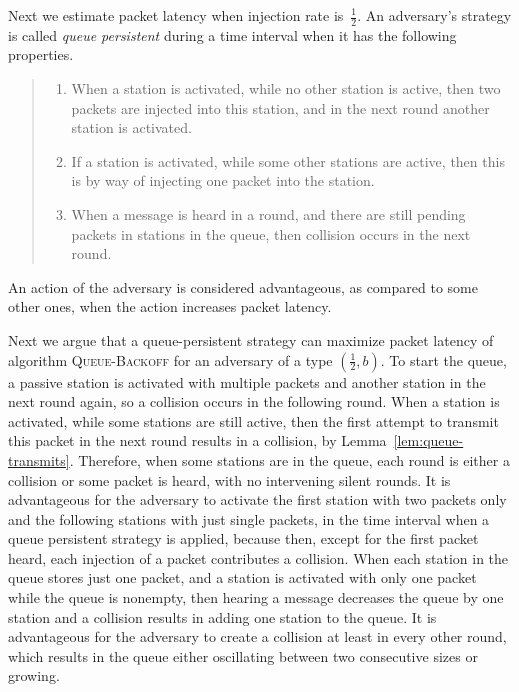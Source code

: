 \documentclass[11pt]{article}
\begin{document}
Next we estimate packet latency when injection rate is~$\frac{1}{2}$.
An adversary's strategy is called \emph{queue persistent}  during a time interval  when it has the following properties.
\begin{quote}
\begin{enumerate}
\item
When a station is activated, while no other station is active, then two packets are injected into this station, and in the next round another station is activated.
\item
If a station is activated, while some other stations are active, then this is by way of injecting one packet into the station.
\item
When a message is heard in a round, and there are still pending packets in stations in the queue,  then collision occurs in the next round.
\end{enumerate}
\end{quote}
An action of the adversary is considered advantageous, as compared to some other ones, when the action increases packet latency. 

Next we argue that a queue-persistent strategy can maximize packet latency of algorithm \textsc{Queue-Backoff} for an adversary of a type $(\frac{1}{2},b)$. 
To start the queue, a passive station is activated with multiple packets and another station in the next round again, so a collision occurs in the following round.
When a station is activated, while some stations are still active, then the first attempt to transmit this packet in the next round results in a collision, by Lemma~\ref{lem:queue-transmits}.
Therefore, when some stations are in the queue, each round is either a collision or some packet is heard, with no intervening silent rounds.
It is advantageous for the adversary to activate the first station with two packets only and the following stations with just single packets, in the time interval when a queue persistent strategy is applied, because then, except for the first packet heard, each injection of a packet contributes a collision.
When each station in the queue stores just one packet, and a station is activated with only one packet while the queue is nonempty, then hearing a message decreases the queue by one station and a collision results in adding one station to the queue. 
It is advantageous for the adversary to  create a collision at least in every other round, which results in the queue either oscillating between two consecutive sizes or growing.
\end{document}
